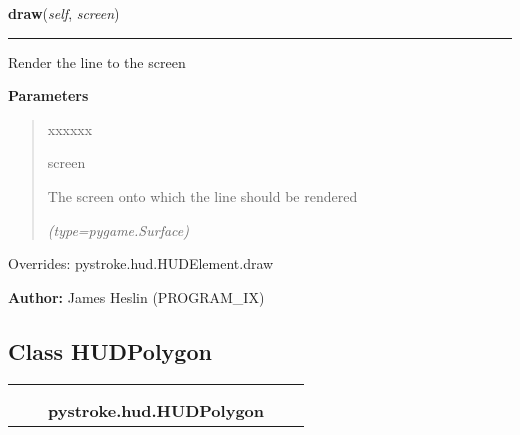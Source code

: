 \hspace{.8\funcindent}\begin{boxedminipage}{\funcwidth}

    \raggedright \textbf{draw}(\textit{self}, \textit{screen})

    \vspace{-1.5ex}

    \rule{\textwidth}{0.5\fboxrule}
\setlength{\parskip}{2ex}
    Render the line to the screen

\setlength{\parskip}{1ex}
      \textbf{Parameters}
      \vspace{-1ex}

      \begin{quote}
        \begin{Ventry}{xxxxxx}

          \item[screen]

          The screen onto which the line should be rendered

            {\it (type=pygame.Surface)}

        \end{Ventry}

      \end{quote}

      Overrides: pystroke.hud.HUDElement.draw

\textbf{Author:} James Heslin (PROGRAM\_IX)



    \end{boxedminipage}



\subsection{Class HUDPolygon}

    \label{pystroke:hud:HUDPolygon}
\begin{tabular}{cccccc}
\multicolumn{2}{r}{\settowidth{\BCL}{pystroke.hud.HUDElement}\multirow{2}{\BCL}{pystroke.hud.HUDElement}}
&&
  \\\cline{3-3}
  &&\multicolumn{1}{c|}{}
&&
  \\
&&\multicolumn{2}{l}{\textbf{pystroke.hud.HUDPolygon}}
\end{tabular}

